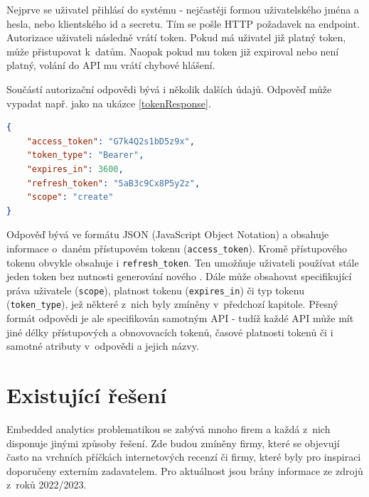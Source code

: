 \documentclass[czech, bc, kiv, he, iso690numb]{fasthesis}
\begin{document}
Nejprve se uživatel přihlásí do systému - nejčastěji formou uživatelského jména a hesla, nebo klientského id a secretu. Tím se pošle HTTP požadavek na endpoint. Autorizace uživateli následně
vrátí token. Pokud má uživatel již platný token, může přistupovat k~datům. Naopak pokud mu token již expiroval nebo není platný, volání do API mu vrátí chybové hlášení. 

Součástí autorizační odpovědi bývá i několik dalších údajů. Odpověď může vypadat např. jako na ukázce \ref{tokenResponse}. 

\begin{minipage}[c]{0.95\textwidth}
\begin{lstlisting}[language=json, caption={Ukázková odpověď autorizačního serveru}, label=tokenResponse]
{
	"access_token": "G7k4Q2s1bD5z9x",
	"token_type": "Bearer",
	"expires_in": 3600,
	"refresh_token": "5aB3c9Cx8P5y2z",
	"scope": "create"
}
\end{lstlisting}
\end{minipage}

Odpověď bývá ve formátu JSON (JavaScript Object Notation) a obsahuje informace o~daném přístupovém tokenu (\texttt{access\_token}). Kromě přístupového tokenu obvykle obsahuje i \texttt{refresh\_token}. Ten umožňuje uživateli 
používat stále jeden token bez nutnosti generování nového \cite{oauthResponseExample}. Dále může obsahovat specifikující práva uživatele (\texttt{scope}), platnost tokenu (\texttt{expires\_in}) či typ tokenu (\texttt{token\_type}), jež některé z~nich byly zmíněny v~předchozí kapitole.
Přesný formát odpovědi je ale specifikován samotným API - tudíž každé API může mít jiné délky přístupových a obnovovacích tokenů, časové platnosti tokenů či i samotné atributy v~odpovědi a jejich názvy.
%
%
\section{Existující řešení}
Embedded analytics problematikou se zabývá mnoho firem a každá z~nich disponuje jinými způsoby řešení. Zde budou zmíněny firmy, které se objevují často na vrchních příčkách
internetových recenzí či firmy, které byly pro inspiraci doporučeny externím zadavatelem. Pro aktuálnost jsou brány informace ze zdrojů z~roků 2022/2023.
\end{document}
